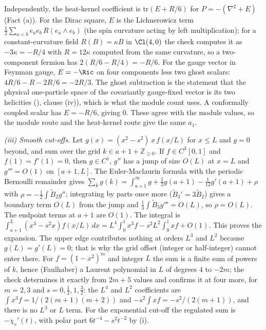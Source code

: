 Independently, the heat-kernel coefficient is $\mathrm{tr}(E + R/6)$ for $P = -(\nabla^{2} + E)$ (Fact (a)). For the Dirac square, $E$ is the Lichnerowicz term $\tfrac12\sum_{a<b}e_{a}e_{b}\,R(e_{a} \wedge e_{b})$ (the spin curvature acting by left multiplication); for a constant-curvature field $R(B) = \kappa B$ in $\Cl(4,0)$ the check computes it as $-3\kappa = -R/4$ with $R = 12\kappa$ computed from the same curvature, so a two-component fermion has $2(R/6 - R/4) = -R/6$. For the gauge vector in Feynman gauge, $E = -\Ric$ on four components less two ghost scalars: $4R/6 - R - 2R/6 = -2R/3$. The ghost subtraction is the statement that the physical one-particle space of the covariantly gauge-fixed vector is its two helicities (), clause (iv)), which is what the module count uses. A conformally coupled scalar has $E = -R/6$, giving $0$. These agree with the module values, so the module route and the heat-kernel route give the same $a_{1}$.

\emph{(iii) Smooth cut-offs.} Let $g(x) = (x^{2} - s^{2})\,x\,f(x/L)$ for $x \le L$ and $g = 0$ beyond, and sum over the grid $k \in a + 1 + \mathbb{Z}_{\ge 0}$. If $f \in C^{3}[0,1]$ and $f(1) = f'(1) = 0$, then $g \in C^{1}$, $g''$ has a jump of size $O(L)$ at $x = L$ and $g''' = O(1)$ on $[a+1, L]$. The Euler-Maclaurin formula with the periodic Bernoulli remainder gives $\sum_{k}g(k) = \int_{a+1}^{\infty}g + \tfrac12 g(a+1) - \tfrac1{12}g'(a+1) + \rho$ with $\rho = -\tfrac12\int\tilde{B}_{2}g''$; integrating by parts once more ($\tilde{B}_{3}' = 3\tilde{B}_{2}$) gives a boundary term $O(L)$ from the jump and $\tfrac13\int\tilde{B}_{3}g''' = O(L)$, so $\rho = O(L)$. The endpoint terms at $a + 1$ are $O(1)$. The integral is $\int_{a+1}^{L}(x^{3} - s^{2}x)f(x/L)\,dx = L^{4}\int_{0}^{1}x^{3}f - s^{2}L^{2}\int_{0}^{1}xf + O(1)$. This proves the expansion. The upper edge contributes nothing at orders $L^{3}$ and $L^{2}$ because $g(L) = g'(L) = 0$; that is why the grid offset (integer or half-integer) cannot enter there. For $f = (1 - x^{2})^{m}$ and integer $L$ the sum is a finite sum of powers of $k$, hence (Faulhaber) a Laurent polynomial in $L$ of degrees $4$ to $-2m$; the check determines it exactly from $2m + 5$ values and confirms it at four more, for $m = 2, 3$ and $s = 0, \tfrac12, 1, \tfrac32$: the $L^{4}$ and $L^{2}$ coefficients are $\int x^{3}f = 1/(2(m+1)(m+2))$ and $-s^{2}\int xf = -s^{2}/(2(m+1))$, and there is no $L^{3}$ or $L$ term. For the exponential cut-off the regulated sum is $-\chi_{s}'(t)$, with polar part $6t^{-4} - s^{2}t^{-2}$ by (i).

